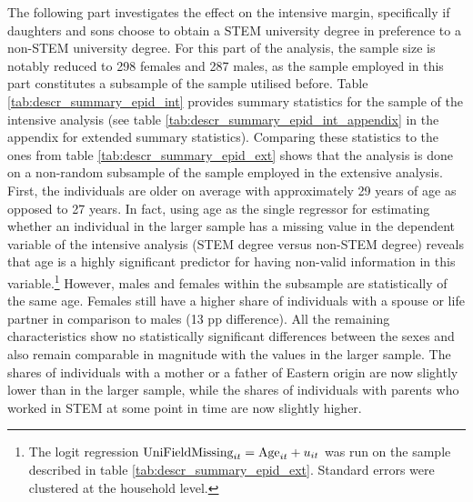 \documentclass[a4paper, oneside, hyperfootnotes = false]{article}
\begin{document}
{The following part investigates the effect on the intensive margin, specifically if daughters and sons choose to obtain a STEM university degree in preference to a non-STEM university degree.
For this part of the analysis, the sample size is notably reduced to 298 females and 287 males, as the sample employed in this part constitutes a subsample of the sample utilised before.
Table \ref{tab:descr_summary_epid_int} provides summary statistics for the sample of the intensive analysis (see table \ref{tab:descr_summary_epid_int_appendix} in the appendix for extended summary statistics).
Comparing these statistics to the ones from table \ref{tab:descr_summary_epid_ext} shows that the analysis is done on a non-random subsample of the sample employed in the extensive analysis.
First, the individuals are older on average with approximately 29 years of age as opposed to 27 years.
In fact, using age as the single regressor for estimating whether an individual in the larger sample has a missing value in the dependent variable of the intensive analysis (STEM degree versus non-STEM degree) reveals that age is a highly significant predictor for having non-valid information in this variable.\footnote{The logit regression $\textnormal{UniFieldMissing}_{it} = \textnormal{Age}_{it} + u_{it}$ was run on the sample described in table \ref{tab:descr_summary_epid_ext}. Standard errors were clustered at the household level.}
However, males and females within the subsample are statistically of the same age.
Females still have a higher share of individuals with a spouse or life partner in comparison to males (13 pp difference).
All the remaining characteristics  show no statistically significant differences between the sexes and also remain comparable in magnitude with the values in the larger sample.
The shares of individuals with a mother or a father of Eastern origin are now slightly lower than in the larger sample, while the shares of individuals with parents who worked in STEM at some point in time are now slightly higher.

}
\end{document}
